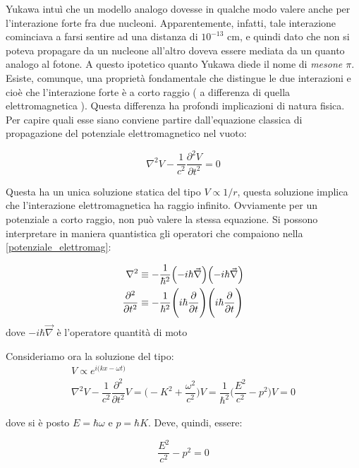 Yukawa intuì che un modello analogo dovesse in qualche modo valere anche per
l'interazione forte fra due nucleoni. Apparentemente, infatti, tale interazione
cominciava a farsi sentire ad una distanza di $10^{-13}$ cm, e quindi dato che
non si poteva propagare da un nucleone all'altro doveva essere mediata da un
quanto analogo al fotone. A questo ipotetico quanto Yukawa diede il nome
di \textit{mesone $\pi$}. Esiste, comunque, una
proprietà fondamentale che distingue le due interazioni e cioè che 
l'interazione
forte è a corto raggio ( a differenza di quella elettromagnetica ). Questa
differenza ha profondi implicazioni di natura fisica. Per capire quali esse
siano conviene partire dall'equazione classica di propagazione del potenziale
elettromagnetico nel vuoto:

\begin{equation}
\label{potenziale_elettromag}
\nabla^2 V - \dfrac{1}{c^2} \dfrac{\partial^2 V}{\partial t^2} = 0
\end{equation}

Questa ha un unica soluzione statica del tipo $V \propto 1/ r$, questa soluzione
implica che l'interazione elettromagnetica ha raggio infinito. Ovviamente per un
potenziale a corto raggio, non può valere la stessa equazione. Si possono
interpretare in maniera quantistica gli operatori che compaiono nella
\ref{potenziale_elettromag}:

\begin{align*}
\nabla^2 &\equiv - \dfrac{1}{\hbar^2} \Bigl(-i \hbar \vec{\nabla} \Bigr) \Bigl( 
-i \hbar \vec{\nabla} \Bigr) \\
\dfrac{\partial^2}{\partial t^2} &\equiv - \dfrac{1}{\hbar^2} \Biggl( i \hbar 
\dfrac{\partial}{\partial t} \Biggr) \Biggl( i \hbar \dfrac{\partial}{\partial 
t} \Biggr) 
\end{align*}
dove $-i \hbar \vec{\nabla}$ è l'operatore quantità di moto 

Consideriamo ora la soluzione del tipo:
\begin{gather*}
V \propto e^{i \bigl(kx - \omega t \bigr)} \\
\nabla^2 V - \dfrac{1}{c^2} \dfrac{\partial^2}{\partial t^2} V = \Biggl (-K^2 + 
\dfrac{\omega^2}{c^2} \Biggr) V = \dfrac{1}{\hbar^2} \Biggl(\dfrac{E^2}{c^2} - 
p^2 \Biggr) V = 0
\end{gather*}

dove si è posto $E=\hbar \omega$ e $p=\hbar K$. Deve, quindi, essere: 

\begin{equation*}
\dfrac{E^2}{c^2} - p^2 = 0
\end{equation*}

